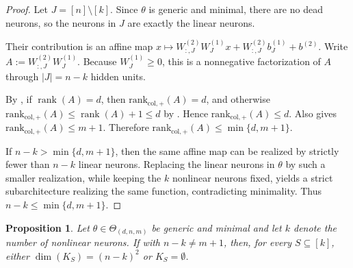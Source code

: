 \documentclass{article}
\newtheorem{prop}[theorem]{Proposition}
\theoremstyle{definition}
\DeclareMathOperator{\rank}{rank}
\newcommand{\paramspace}[1]{\Theta_{#1}}
\newcommand{\weights}[1]{W^{(#1)}}
\newcommand{\bias}[1]{b^{(#1)}}
\newcommand{\nncr}[1]{\mathrm{rank}_{\mathrm{col},+}(#1)}
\begin{document}
\begin{proof}
Let $J=[n]\setminus[k]$. Since $\theta$ is generic and minimal, there are no dead neurons,
so the neurons in $J$ are exactly the linear neurons.

Their contribution is an affine map
$
x \mapsto \weights{2}_{:,J}\weights{1}_J x + \weights{2}_{:,J}\bias{1}_J + \bias{2}.
$
Write
$
A:=\weights{2}_{:,J}\weights{1}_J.
$
Because $\weights{1}_J\ge 0$, this is a nonnegative factorization of $A$ through $|J|=n-k$
hidden units.

By , if $\rank(A)=d$, then $\nncr{A}=d$, and otherwise
$\nncr{A}\le \rank(A)+1\le d$ by . Hence $\nncr{A}\le d$.
Also  gives $\nncr{A}\le m+1$. Therefore
$
\nncr{A}\le \min\{d,m+1\}.
$

If $n-k>\min\{d,m+1\}$, then the same affine map can be realized by strictly fewer than
$n-k$ linear neurons. Replacing the linear neurons in $\theta$ by such a smaller realization,
while keeping the $k$ nonlinear neurons fixed, yields a strict subarchitecture realizing the
same function, contradicting minimality. Thus
$n-k\le \min\{d,m+1\}$. 
\end{proof}
\begin{prop}
\label{prop:empty_or_dim}
Let $\theta \in \paramspace{(d,n,m)}$ be generic and minimal and let $k$ denote the number of nonlinear neurons. If with $n-k \neq m+1$, then, for every $S \subseteq [k]$, either $\dim(K_S) = (n-k)^2$ or $K_S=\emptyset$. 
\end{prop}
\end{document}
